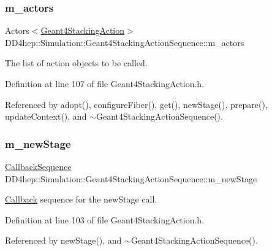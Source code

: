 \subsubsection{\texorpdfstring{m\+\_\+actors}{m\_actors}}
{\footnotesize\ttfamily Actors$<$\hyperlink{class_d_d4hep_1_1_simulation_1_1_geant4_stacking_action}{Geant4\+Stacking\+Action}$>$ D\+D4hep\+::\+Simulation\+::\+Geant4\+Stacking\+Action\+Sequence\+::m\+\_\+actors\hspace{0.3cm}{\ttfamily [protected]}}



The list of action objects to be called. 



Definition at line 107 of file Geant4\+Stacking\+Action.\+h.



Referenced by adopt(), configure\+Fiber(), get(), new\+Stage(), prepare(), update\+Context(), and $\sim$\+Geant4\+Stacking\+Action\+Sequence().

\hypertarget{class_d_d4hep_1_1_simulation_1_1_geant4_stacking_action_sequence_a9a67c9ae5d00befcdfaa81dfcac6dfb1}{}\label{class_d_d4hep_1_1_simulation_1_1_geant4_stacking_action_sequence_a9a67c9ae5d00befcdfaa81dfcac6dfb1} 
\subsubsection{\texorpdfstring{m\+\_\+new\+Stage}{m\_newStage}}
{\footnotesize\ttfamily \hyperlink{struct_d_d4hep_1_1_callback_sequence}{Callback\+Sequence} D\+D4hep\+::\+Simulation\+::\+Geant4\+Stacking\+Action\+Sequence\+::m\+\_\+new\+Stage\hspace{0.3cm}{\ttfamily [protected]}}



\hyperlink{class_d_d4hep_1_1_callback}{Callback} sequence for the new\+Stage call. 



Definition at line 103 of file Geant4\+Stacking\+Action.\+h.



Referenced by new\+Stage(), and $\sim$\+Geant4\+Stacking\+Action\+Sequence().

